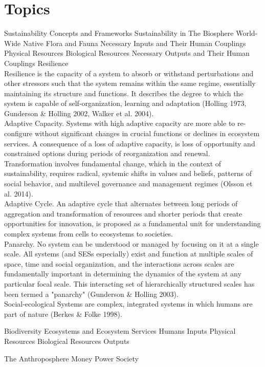 \documentclass[12pt, letterpaper]{article}
\begin{document}
\section{Topics}
\begin{outline}[enumerate]
\1 Sustainability Concepts and Frameworks
\1 Sustainability in The Biosphere
\2 World-Wide Native Flora and Fauna
\3 Necessary Inputs and Their Human Couplings
\4 Physical Resources
\4 Biological Resources
\3 Necessary Outputs and Their Human Couplings
\4 Resilience \\
Resilience is the capacity of a system to absorb or withstand perturbations and other stressors such that the system remains within the same regime, essentially maintaining its structure and functions. It describes the degree to which the system is capable of self-organization, learning and adaptation (Holling 1973, Gunderson \& Holling 2002, Walker et al. 2004). \\

Adaptive Capacity. Systems with high adaptive capacity are more able to re-configure without significant changes in crucial functions or declines in ecosystem services. A consequence of a loss of adaptive capacity, is loss of opportunity and constrained options during periods of reorganization and renewal.\\

Transformation involves fundamental change, which in the context of sustainability, requires radical, systemic shifts in values and beliefs, patterns of social behavior, and multilevel governance and management regimes (Olsson et al. 2014).\\

Adaptive Cycle. An adaptive cycle that alternates between long periods of aggregation and transformation of resources and shorter periods that create opportunities for innovation, is proposed as a fundamental unit for understanding complex systems from cells to ecosystems to societies.\\

Panarchy. No system can be understood or managed by focusing on it at a single scale. All systems (and SESs especially) exist and function at multiple scales of space, time and social organization, and the interactions across scales are fundamentally important in determining the dynamics of the system at any particular focal scale. This interacting set of hierarchically structured scales has been termed a "panarchy" (Gunderson \& Holling 2003).\\

Social-ecological Systems are complex, integrated systems in which humans are part of nature (Berkes \& Folke 1998).


\4 Biodiversity
\4 Ecosystems and Ecosystem Services
\2 Humans
\3 Inputs
\4 Physical Resources
\4 Biological Resources
\3 Outputs
\4 
\4 

\1 The Anthroposphere
\2 Money
\2 Power
\2 Society

\end{outline}







\clearpage 
\renewcommand{\thepage}{}
\printbibliography
\end{document}
